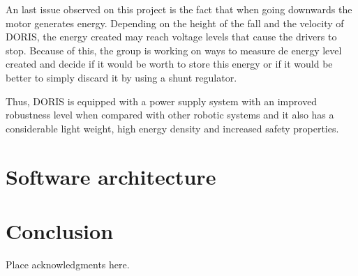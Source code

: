 \documentclass{ifacconf}
\begin{document}
An last issue observed on this project is the fact that when going downwards
the motor generates energy. Depending on the height of the fall and the
velocity of DORIS, the energy created may reach voltage levels that cause the
drivers to stop. Because of this, the group is working on ways to measure de
energy level created and decide if it would be worth to store this energy or if
it would be better to simply discard it by using a shunt regulator.

Thus, DORIS is equipped with a power supply system with an improved robustness
level when compared with other robotic systems and it also has a considerable
light weight, high energy density and increased safety properties.


\section{Software architecture}\label{sec:software_overview}

\section{Conclusion}\label{sec:conclusions}
 

\begin{ack}
Place acknowledgments here.
\end{ack}

                                                   




\end{document}

